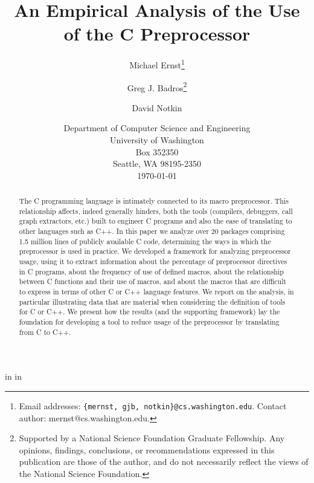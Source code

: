 
\marginparwidth 0pt
\oddsidemargin  0pt
\evensidemargin 0pt
\marginparsep 0pt

\topmargin   0pt

 in
 in




\title{An Empirical Analysis of the Use of the C Preprocessor}

\author{Michael Ernst\thanks{Email 
addresses: {\tt \{mernst, gjb, notkin\}@cs.washington.edu}.  Contact author:
mernst@cs.washington.edu.}
\and Greg J. Badros\thanks{Supported by a National Science Foundation
    Graduate Fellowship. Any opinions, findings, conclusions, or
    recommendations expressed in this publication are those of the
    author, and do not necessarily reflect the views of the National
    Science Foundation.} \and David Notkin}

\date{Department of Computer
Science and Engineering\\
University of Washington\\
Box 352350\\
Seattle, WA  98195-2350\\
\today}  

\maketitle


\begin{abstract}

  The C programming language is intimately connected to its macro
  preprocessor.  This relationship affects, indeed generally hinders,
  both the tools (compilers, debuggers, call graph extractors, etc.)
  built to engineer C programs and also the ease of translating to other
  languages such as C++.  In this paper we analyze over 20 packages
  comprising 1.5 million lines of publicly available C code, determining
  the ways in which the preprocessor is used in practice.  We developed
  a framework for analyzing preprocessor usage, using it to extract
  information about the percentage of preprocessor directives in C
  programs, about the frequency of use of defined macros, about the
  relationship between C functions and their use of macros, and about
  the macros that are difficult to express in terms of other C or C++
  language features.  We report on the analysis, in particular
  illustrating data that are material when considering the definition of
  tools for C or C++.  We present how the results (and the supporting
  framework) lay the foundation for developing a tool to reduce usage of
  the preprocessor by translating from C to C++.

\end{abstract}

